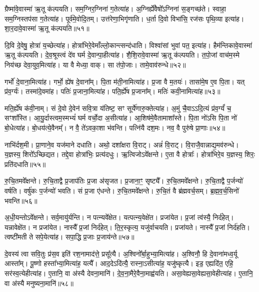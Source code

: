 ग्रैष्मा॑वे॒वास्मा॑ ऋ॒तू क॑ल्पयति। 
सम॒ग्निर॒ग्निना॑ ग॒तेत्या॑ह। 
अ॒ग्निर्ह्ये॑वैषो᳚ऽग्निना॑ स॒ङ्गच्छ॑ते। 
स्वाहा॒ सम॒ग्निस्तप॑सा ग॒तेत्या॑ह। 
पूर्व॑मे॒वोदि॒तम्। 
उत्त॑रेणा॒भिगृ॑णाति। 
ध॒र्ता दि॒वो विभा॑सि॒ रज॑सः पृथि॒व्या इत्या॑ह। 
शा॒र॒दावे॒वास्मा॑ ऋ॒तू क॑ल्पयति॥५१॥

दि॒वि दे॒वेषु॒ होत्रा॑ य॒च्छेत्या॑ह। 
होत्रा॑भिरे॒वेमाँल्लो॒कान्त्सन्द॑\-धाति। 
विश्वा॑सां भुवां पत॒ इत्या॑ह। 
हैम॑न्तिकावे॒वास्मा॑ ऋ॒तू क॑ल्पयति। 
दे॒व॒श्रूस्त्वं दे॑व घर्म दे॒वान्पा॒हीत्या॑ह। 
शै॒शि॒रावे॒वास्मा॑ ऋ॒तू क॑ल्पयति। 
त॒पो॒जां वाच॑म॒स्मे निय॑च्छ देवा॒युव॒मित्या॑ह। 
या वै मेध्या॒ वाक्। 
सा त॑पो॒जाः। 
तामे॒वाव॑रुन्धे॥५२॥

गर्भो॑ दे॒वाना॒मित्या॑ह। 
गर्भो॒ ह्ये॑ष दे॒वाना᳚म्। 
पि॒ता म॑ती॒नामित्या॑ह। 
प्र॒जा वै म॒तयः॑। 
तासा॑मे॒ष ए॒व पि॒ता। 
यत् प्र॑व॒र्ग्यः॑। 
तस्मा॑दे॒वमा॑ह। 
पतिः॑ प्र॒जाना॒मित्या॑ह। 
पति॒र्ह्ये॑ष प्र॒जाना᳚म्। 
मतिः॑ कवी॒नामित्या॑ह॥५३॥

मति॒र्ह्ये॑ष क॑वी॒नाम्। 
सं दे॒वो दे॒वेन॑ सवि॒त्रा य॑तिष्ट॒ सꣳ सूर्ये॑णारु॒क्तेत्या॑ह। 
अ॒मुं चै॒वाऽऽदि॒त्यं प्र॑व॒र्ग्यं॑ च॒ सꣳशा᳚स्ति। 
आ॒यु॒र्दास्त्वम॒स्मभ्यं॑ घर्म वर्चो॒दा अ॒सीत्या॑ह। 
आ॒शिष॑मे॒वैतामाशा᳚स्ते। 
पि॒ता नो॑ऽसि पि॒ता नो॑ बो॒धेत्या॑ह। 
बो॒धय॑त्ये॒वैनम्᳚। 
न वै॒ ते॑ऽवका॒शा भ॑वन्ति। 
पत्नि॑यै दश॒मः। 
नव॒ वै पुरु॑षे प्रा॒णाः॥५४॥

नाभि॑र्दश॒मी। 
प्रा॒णाने॒व यज॑माने दधाति। 
अथो॒ दशा᳚क्षरा वि॒राट्। 
अन्नं॑  वि॒राट्। 
वि॒राजै॒वान्नाद्य॒मव॑रुन्धे। 
य॒ज्ञस्य॒ शिरो᳚ऽच्छिद्यत। 
तद्दे॒वा होत्रा॑भिः॒ प्रत्य॑दधुः। 
ऋ॒त्विजोऽवे᳚क्षन्ते। 
ए॒ता वै होत्राः᳚। 
होत्रा॑भिरे॒व य॒ज्ञस्य॒ शिरः॒ प्रति॑दधाति॥५५॥

रु॒चि॒तमवे᳚क्षन्ते। 
रु॒चि॒ताद्वै प्र॒जाप॑तिः प्र॒जा अ॑सृजत। 
प्र॒जाना॒ꣳ॒ सृष्ट्यै᳚। 
रु॒चि॒तमवे᳚क्षन्ते। 
रु॒चि॒ताद्वै प॒र्जन्यो॑ वर्\mbox{}षति। 
वर्\mbox{}षु॑कः प॒र्जन्यो॑ भवति। 
सं प्र॒जा ए॑धन्ते। 
रु॒चि॒तमवे᳚क्षन्ते। 
रु॒चि॒तं वै ब्र॑ह्मवर्च॒सम्। 
ब्र॒ह्म॒व॒र्च॒सिनो॑ भवन्ति॥५६॥

अ॒धी॒यन्तोऽवे᳚क्षन्ते। 
सर्व॒मायु॑र्\mbox{}यन्ति। 
न पत्न्यवे᳚क्षेत। 
यत्पत्न्य॒वेक्षे॑त। 
प्रजा॑येत। 
प्र॒जां त्व॑स्यै॒ निर्द॑हेत्। 
यन्नावेक्षे॑त। 
न प्रजा॑येत। 
नास्यै᳚ प्र॒जां निर्द॑हेत्। 
ति॒र॒स्कृत्य॒ यजु॑र्वाचयति। 
प्रजा॑यते। 
नास्यै᳚ प्र॒जां निर्द॑हति। 
त्वष्टी॑मती ते सपे॒येत्या॑ह। 
सपा॒द्धि प्र॒जाः प्र॒जाय॑न्ते॥५७॥

दे॒वस्य॑ त्वा सवि॒तुः प्र॑स॒व इति॑ रश॒नामाद॑त्ते॒ प्रसू᳚त्यै। 
अ॒श्विनो᳚र्बा॒हुभ्या॒मित्या॑ह। 
अ॒श्विनौ॒ हि दे॒वाना॑मध्व॒र्यू आस्ता᳚म्। 
पू॒ष्णो हस्ता᳚भ्या॒मित्या॑ह॒ यत्यै᳚। 
आद॒देऽदि॑त्यै॒ रास्ना॒ऽसीत्या॑ह॒ यजु॑ष्कृत्यै। 
इड॒ एह्यदि॑त॒ एहि॒ सर॑स्व॒त्येहीत्या॑ह। 
ए॒तानि॒ वा अ॑स्यै देवना॒मानि॑। 
दे॒व॒ना॒मैरे॒वैना॒माह्व॑यति। 
असा॒वेह्यसा॒वेह्यसा॒वेहीत्या॑ह। 
ए॒तानि॒ वा अ॑स्यै मनुष्यना॒मानि॑॥५८॥

